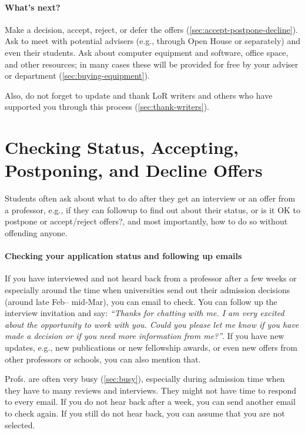 \documentclass[oneside,11pt]{book}
\begin{document}
\paragraph{What's next?} Make a decision, accept, reject, or defer the offers  (\autoref{sec:accept-postpone-decline}). Ask to meet with potential advisers (e.g., through Open House or separately) and even their students. Ask about computer equipment and software, office space, and other resources; in many cases these will be provided for free by your adviser or department (\autoref{sec:buying-equipment}).

Also, do not forget to update and thank LoR writers and others who have supported you through this process (\autoref{sec:thank-writers}).




\section{Checking Status, Accepting, Postponing, and Decline Offers}\label{sec:accept-postpone-decline}

Students often ask about what to do after they get an interview or an offer from a professor, e.g., if they can followup to find out about their status, or is it OK to postpone or accept/reject offers?, and most importantly, how to do so without offending anyone. 

\paragraph{Checking your application status and following up emails} If you have interviewed and not heard back from a professor after a few weeks or especially around the time when universities send out their admission decisions (around late Feb-- mid-Mar), you can email to check.  You can follow up the interview invitation and say: \emph{``Thanks for chatting with me. I am very excited about the opportunity to work with you.  Could you please let me know if you have made a decision or if you need more information from me?''}.  If you have new updates, e.g., new publications or new fellowship awards, or even new offers from other professors or schools, you can also mention that.

Profs. are often very busy (\autoref{sec:busy}), especially during admission time when they have to many reviews and interviews.  They might not have time to respond to every email.  If you do not hear back after a week, you can send another email to check again.  If you still do not hear back, you can assume that you are not selected.
\end{document}
